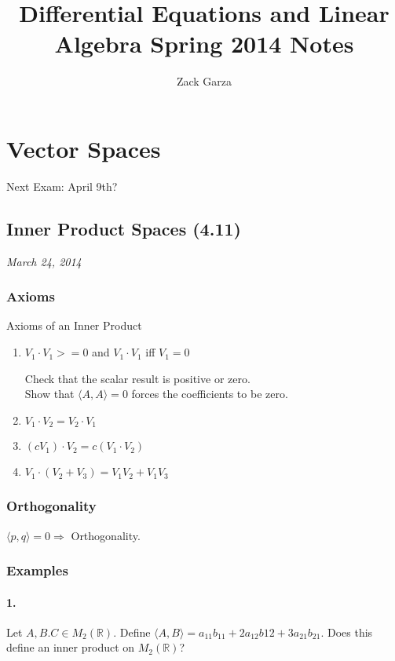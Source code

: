 \documentclass[a4paper,10pt]{report}
\begin{document}
\title{Differential Equations and Linear Algebra Spring 2014 Notes}
\author{Zack Garza}
\maketitle
\tableofcontents

\chapter{Vector Spaces}
Next Exam: April 9th?

\section{Inner Product Spaces (4.11)}
\textit{March 24, 2014}\\

\subsection{Axioms}
 Axioms of an Inner Product
\begin{enumerate}
  \item $V_1 \cdot V_1 >= 0$ and $V_1\cdot V_1$ iff $V_1 = 0$

    Check that the scalar result is positive or zero.\\
    Show that $\langle A,A\rangle = 0$ forces the coefficients to be zero.
  \item $V_1 \cdot V_2 = V_2 \cdot V_1$
  \item $(cV_1)\cdot V_2 = c(V_1\cdot V_2)$
  \item $V_1 \cdot (V_2 + V_3) = V_1 V_2 + V_1 V_3$
\end{enumerate}

\subsection{Orthogonality}
$\langle p,q\rangle =0 \Rightarrow$ Orthogonality.

\subsection{Examples}
\subsubsection*{1.}
Let $A, B. C \in M_2 (\mathbb{R})$. Define $\langle A,B\rangle = a_{11}b_{11}+2a_{12}b{12}+3a_{21}b_{21}$. Does this define an inner product on $M_2 (\mathbb{R})$?
\end{document}
